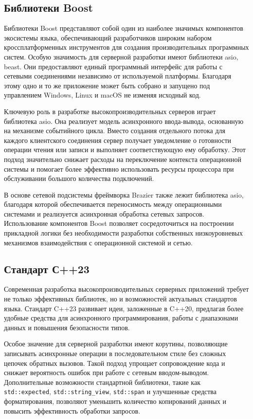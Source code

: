 \documentclass[14pt]{extarticle}
\let\oldtexttt\texttt
\renewcommand{\texttt}[1]{{\normalsize\oldtexttt{#1}}}
\begin{document}
\subsection{Библиотеки Boost}

Библиотеки Boost представляют собой один из наиболее значимых компонентов экосистемы языка, обеспечивающий разработчиков широким набором кроссплатформенных инструментов для создания производительных программных систем. Особую значимость для серверной разработки имеют библиотеки asio, beast. Они предоставляют единый программный интерфейс для работы с сетевыми соединениями независимо от используемой платформы. Благодаря этому одно и то же приложение может быть собрано и запущено под управлением Windows, Linux и macOS не изменяя исходный код.

Ключевую роль в разработке высокопроизводительных серверов играет библиотека asio. Она реализует модель асинхронного ввода-вывода, основанную на механизме событийного цикла. Вместо создания отдельного потока для каждого клиентского соединения сервер получает уведомление о готовности операции чтения или записи и выполняет соответствующую ему обработку. Этот подход значительно снижает расходы на переключение контекста операционной системы и помогает более эффективно использовать ресурсы процессора при обслуживании большого количества подключений.

В основе сетевой подсистемы фреймворка Brazier также лежит библиотека asio, благодаря которой обеспечивается переносимость между операционными системами и реализуется асинхронная обработка сетевых запросов. Использование компонентов Boost позволяет сосредоточиться на построении прикладной логики без необходимости разработки собственных низкоуровневых механизмов взаимодействия с операционной системой и сетью.

\subsection{Стандарт С++23}

Современная разработка высокопроизводительных серверных приложений требует не только эффективных библиотек, но и возможностей актуальных стандартов языка. Стандарт C++23 развивает идеи, заложенные в C++20, предлагая более удобные средства для асинхронного программирования, работы с диапазонами данных и повышения безопасности типов. 

Особое значение для серверной разработки имеют корутины, позволяющие записывать асинхронные операции в последовательном стиле без сложных цепочек обратных вызовов. Такой подход упрощает сопровождение кода и снижает вероятность ошибок при работе с сетевым вводом-выводом. Дополнительные возможности стандартной библиотеки, такие как \texttt{std::expected}, \texttt{std::string\_view}, \texttt{std::span} и улучшенные средства форматирования, позволяют уменьшить количество копирований данных и повысить эффективность обработки запросов. 
\end{document}
